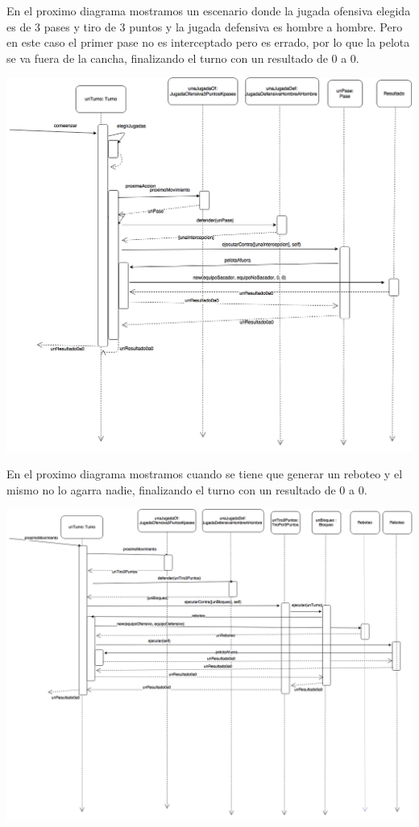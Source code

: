 En el proximo diagrama mostramos un escenario donde la jugada ofensiva elegida es de 3 pases y tiro de 3 puntos y la jugada defensiva es hombre a hombre. Pero en este caso el primer pase no es interceptado pero es errado, por lo que la pelota se va fuera de la cancha, finalizando el turno con un resultado de 0 a 0.
\begin{center}
  \includegraphics[scale=0.45]{imagenes/turno-pase-afuera.png}
\end{center}

En el proximo diagrama mostramos cuando se tiene que generar un reboteo y el mismo no lo agarra nadie, finalizando el turno con un resultado de 0 a 0.
\begin{center}
  \includegraphics[scale=0.45]{imagenes/turno-reboteo-afuera.png}
\end{center}
